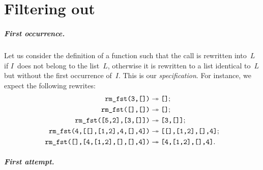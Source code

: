 
\chapter{Filtering out}
\label{chap:filtering_out}

\paragraph{First occurrence.}

Let us consider the definition of a function  such
that the call  is rewritten into~\(L\)
if \(I\)~does not belong to the list~\(L\), otherwise it is rewritten
to a list identical to~\(L\) but without the first occurrence
of~\(I\). This is our \emph{specification}. For instance, we expect
the following rewrites:\label{rm_fst_ex}
\begin{align*}
\texttt{rm\_fst(3,[])}         & \twoheadrightarrow \texttt{[]};\\
\texttt{rm\_fst([],[])}        & \twoheadrightarrow \texttt{[]};\\
\texttt{rm\_fst([5,2],[3,[]])} & \twoheadrightarrow \texttt{[3,[]]};\\
\texttt{rm\_fst(4,[[],[1,2],4,[],4])}
 & \twoheadrightarrow \texttt{[[],[1,2],[],4]};\\
\texttt{rm\_fst([],[4,[1,2],[],[],4])}
 & \twoheadrightarrow \texttt{[4,[1,2],[],4]}.
\end{align*}

\paragraph{First attempt.}

